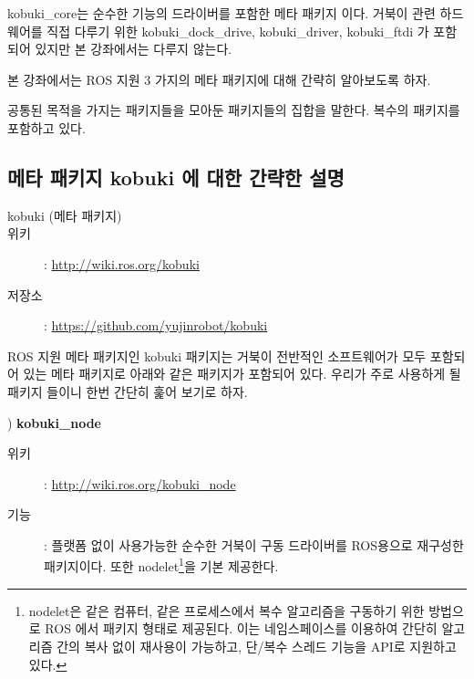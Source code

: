 kobuki\_core는 순수한 기능의 드라이버를 포함한 메타 패키지 이다. 거북이 관련 하드웨어를 직접 다루기 위한 kobuki\_dock\_drive, kobuki\_driver, kobuki\_ftdi 가 포함되어 있지만 본 강좌에서는 다루지 않는다.

본 강좌에서는 ROS 지원 3 가지의 메타 패키지에 대해 간략히 알아보도록 하자.

\begin{definition}
공통된 목적을 가지는 패키지들을 모아둔 패키지들의 집합을 말한다. 복수의 패키지를 포함하고 있다.
\end{definition}

\subsection{메타 패키지 kobuki 에 대한 간략한 설명}

\vspace{\baselineskip}
\begin{description}
\item[kobuki (메타 패키지)]
\item[위키]: \url{http://wiki.ros.org/kobuki}
\item[저장소]: \url{https://github.com/yujinrobot/kobuki}
\end{description}

\vspace{\baselineskip}
\noindent
ROS 지원 메타 패키지인 kobuki 패키지는 거북이 전반적인 소프트웨어가 모두 포함되어 있는 메타 패키지로 아래와 같은 패키지가 포함되어 있다. 우리가 주로 사용하게 될 패키지 들이니 한번 간단히 훑어 보기로 하자.

\setcounter{num}{0}

\vspace{\baselineskip}
\noindent{}
\thenum) \textbf{kobuki\_node}
\begin{description}
\item[위키]: \url{http://wiki.ros.org/kobuki_node}
\item[기능]: 플랫폼 없이 사용가능한 순수한 거북이 구동 드라이버를 ROS용으로 재구성한 패키지이다. 또한 nodelet\footnote{nodelet은 같은 컴퓨터, 같은 프로세스에서 복수 알고리즘을 구동하기 위한 방법으로 ROS 에서 패키지 형태로 제공된다. 이는 네임스페이스를 이용하여 간단히 알고리즘 간의 복사 없이 재사용이 가능하고, 단/복수 스레드 기능을 API로 지원하고 있다.}을 기본 제공한다.
\end{description}


